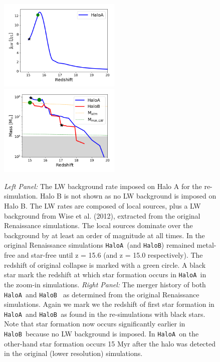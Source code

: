 \documentclass[graphics, twocolumn, usenatbib]{mn2e}
\newcommand{\ha} {\texttt{HaloA~}}
\newcommand{\hb} {\texttt{HaloB~}}
\begin{document}
\begin{figure}
\centering
\begin{minipage}{175mm}      \begin{center} 
\centerline{
\includegraphics[width=0.52\textwidth]{FIGURES/Combined.png}
\includegraphics[width=0.52\textwidth]{FIGURES/MassHistory.png}}
\caption{\textit{Left Panel:} The LW background rate imposed on Halo A for the re-simulation. Halo B is not shown
  as no LW background is imposed on Halo B. The LW rates
  are composed of local sources, plus a LW background from Wise et al. (2012), extracted from the original
  Renaissance simulations. The local sources dominate over the background by at least an order of magnitude at
  all times. In the original
  Renaissance simulations \ha (and \texttt{HaloB})  remained metal-free and star-free until z = 15.6 (and
  z = 15.0 respectively). The redshift of original collapse is marked with a green circle.
  A black star mark the redshift at which star formation occurs in \ha in the zoom-in simulations.
  \textit{Right Panel:} The merger history of both \ha and \hb
  as determined from the original Renaissance simulations. Again we mark we the redshift of first star formation
  in \ha and \hb as found in the re-simulations with black stars. Note that star formation now occurs significantly
  earlier in \hb because no LW background is imposed. In \ha on the other-hand star formation occurs 15 Myr after
  the halo was detected in the original (lower resolution) simulations. 
  }  \label{Fig:LWHistory}
\end{center} \end{minipage}

\end{figure}
\end{document}
